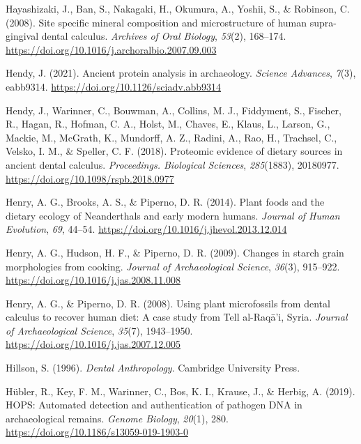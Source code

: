 \documentclass[
  letterpaper,
]{book}
\newlength{\cslhangindent}
\newlength{\cslentryspacingunit} %
\newenvironment{CSLReferences}[2] %
 {%
  \setlength{\parindent}{0pt}
  \ifodd #1
  \let\oldpar\par
  \def\par{\hangindent=\cslhangindent\oldpar}
  \fi
  \setlength{\parskip}{#2\cslentryspacingunit}
 }%
 {}
\begin{document}
\begin{CSLReferences}{1}{0}
\leavevmode{}%
Hayashizaki, J., Ban, S., Nakagaki, H., Okumura, A., Yoshii, S., \&
Robinson, C. (2008). Site specific mineral composition and
microstructure of human supra-gingival dental calculus. \emph{Archives
of Oral Biology}, \emph{53}(2), 168--174.
\url{https://doi.org/10.1016/j.archoralbio.2007.09.003}

\leavevmode{}%
Hendy, J. (2021). Ancient protein analysis in archaeology. \emph{Science
Advances}, \emph{7}(3), eabb9314.
\url{https://doi.org/10.1126/sciadv.abb9314}

\leavevmode{}%
Hendy, J., Warinner, C., Bouwman, A., Collins, M. J., Fiddyment, S.,
Fischer, R., Hagan, R., Hofman, C. A., Holst, M., Chaves, E., Klaus, L.,
Larson, G., Mackie, M., McGrath, K., Mundorff, A. Z., Radini, A., Rao,
H., Trachsel, C., Velsko, I. M., \& Speller, C. F. (2018). Proteomic
evidence of dietary sources in ancient dental calculus.
\emph{Proceedings. Biological Sciences}, \emph{285}(1883), 20180977.
\url{https://doi.org/10.1098/rspb.2018.0977}

\leavevmode{}%
Henry, A. G., Brooks, A. S., \& Piperno, D. R. (2014). Plant foods and
the dietary ecology of {Neanderthals} and early modern humans.
\emph{Journal of Human Evolution}, \emph{69}, 44--54.
\url{https://doi.org/10.1016/j.jhevol.2013.12.014}

\leavevmode{}%
Henry, A. G., Hudson, H. F., \& Piperno, D. R. (2009). Changes in starch
grain morphologies from cooking. \emph{Journal of Archaeological
Science}, \emph{36}(3), 915--922.
\url{https://doi.org/10.1016/j.jas.2008.11.008}

\leavevmode{}%
Henry, A. G., \& Piperno, D. R. (2008). Using plant microfossils from
dental calculus to recover human diet: A case study from {Tell}
al-{Raqā}'i, {Syria}. \emph{Journal of Archaeological Science},
\emph{35}(7), 1943--1950.
\url{https://doi.org/10.1016/j.jas.2007.12.005}

\leavevmode{}%
Hillson, S. (1996). \emph{Dental {Anthropology}}. {Cambridge University
Press}.

\leavevmode{}%
Hübler, R., Key, F. M., Warinner, C., Bos, K. I., Krause, J., \& Herbig,
A. (2019). {HOPS}: Automated detection and authentication of pathogen
{DNA} in archaeological remains. \emph{Genome Biology}, \emph{20}(1),
280. \url{https://doi.org/10.1186/s13059-019-1903-0}


\end{CSLReferences}
\end{document}
